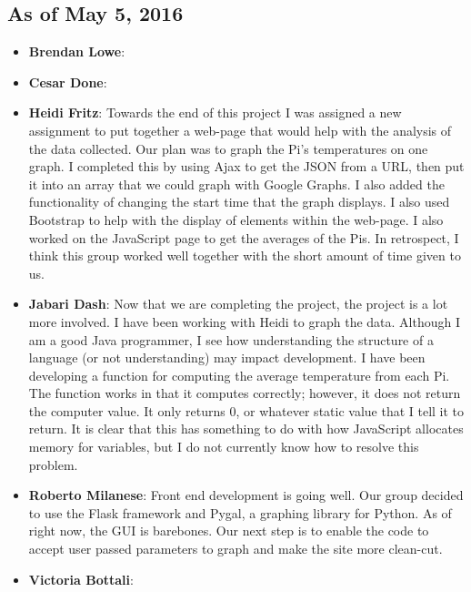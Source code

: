 \documentclass{article}
\begin{document}
			\subsection{As of May 5, 2016}
				\begin{itemize}
					\item {\bfseries Brendan Lowe}:
					\item {\bfseries Cesar Done}:
					\item {\bfseries Heidi Fritz}: Towards the end of this project I was assigned a new assignment to put together a web-page that would help   												   with the 
									   analysis of the data collected.  Our plan was to graph the Pi's temperatures on one graph.  I completed this by using 
									   Ajax to get the JSON from a URL, then put it into an array that we could graph with Google Graphs.  I also added the 
									   functionality of changing the start time that the graph displays.  I also used Bootstrap to help with the display of 
									   elements within the web-page.  I also worked on the JavaScript page to get the averages of the Pis.  In retrospect, I 
									   think this group worked well together with the short amount of time given to us.  
					\item {\bfseries Jabari Dash}: Now that we are completing the project, the project is a lot more involved. I have been working with
												   Heidi to graph the data. Although I am a good Java programmer, I see how understanding the structure
												   of a language (or not understanding) may impact development. I have been developing a function for 
												   computing the average temperature from each Pi. The function works in that it computes correctly; however,
												   it does not return the computer value. It only returns 0, or whatever static value that I tell it to 
												   return. It is clear that this has something to do with how  JavaScript allocates memory for variables,
												   but I do not currently know how to resolve this problem.
					\item {\bfseries Roberto Milanese}: Front end development is going well. Our group decided to use the Flask framework and Pygal, a 																	graphing library for Python. As of right now, the GUI is barebones. Our next step is to enable the 																code to accept user passed parameters to graph and make the site more clean-cut. 

					
					\item {\bfseries Victoria Bottali}:			
				\end{itemize}
			
\end{document}
